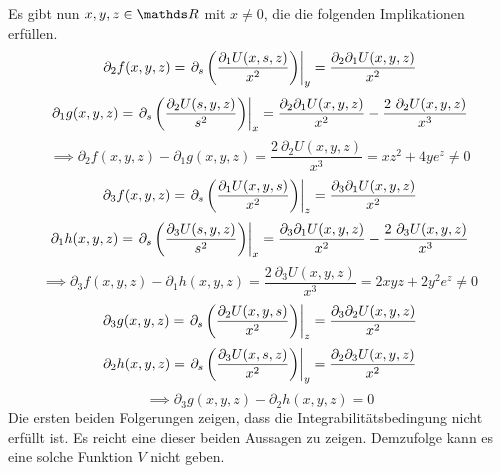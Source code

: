\begin{atiSolution}
\begin{atiSubtaskSolutions}
{      Es gibt nun $x,y,z\in\setR$ mit $x\neq 0$, die die folgenden Implikationen erfüllen.
      \[
        \partial_2f(x,y,z) = \left.\partial_{s} \left( \frac{\partial_1U(x,s,z)}{x^2} \right)\right\vert_{y}^{} = \frac{\partial_2\partial_1U(x,y,z)}{x^2}
      \]
      \[
        \partial_1g(x,y,z) = \pdrvopb{s}{\curvb{\frac{\partial_2U(s,y,z)}{s^2}}}{x} = \frac{\partial_2\partial_1U(x,y,z)}{x^2} - \frac{2\ \partial_2U(x,y,z)}{x^3}
      \]
      \[
        \implies \partial_2f(x,y,z) - \partial_1g(x,y,z) = \frac{2\ \partial_2U(x,y,z)}{x^3} = xz^2 + 4ye^z \neq 0
      \]
      \[
        \partial_3f(x,y,z) = \left.\partial_{s} \left( \frac{\partial_1U(x,y,s)}{x^2} \right)\right\vert_{z}^{} = \frac{\partial_3\partial_1U(x,y,z)}{x^2}
      \]
      \[
        \partial_1h(x,y,z) = \pdrvopb{s}{\curvb{\frac{\partial_3U(s,y,z)}{s^2}}}{x} = \frac{\partial_3\partial_1U(x,y,z)}{x^2} - \frac{2\ \partial_3U(x,y,z)}{x^3}
      \]
      \[
        \implies \partial_3f(x,y,z) - \partial_1h(x,y,z) = \frac{2\ \partial_3U(x,y,z)}{x^3} = 2xyz + 2y^2e^z \neq 0
      \]
      \[
        \partial_3g(x,y,z) = \left.\partial_{s} \left( \frac{\partial_2U(x,y,s)}{x^2} \right)\right\vert_{z}^{} = \frac{\partial_3\partial_2U(x,y,z)}{x^2}
      \]
      \[
        \partial_2h(x,y,z) = \left.\partial_{s} \left( \frac{\partial_3U(x,s,z)}{x^2} \right)\right\vert_{y}^{} = \frac{\partial_2\partial_3U(x,y,z)}{x^2}
      \]
      \[
        \implies \partial_3g(x,y,z) - \partial_2h(x,y,z) = 0
      \]
      \atiPoints[1]Die ersten beiden Folgerungen zeigen, dass die Integrabilitätsbedingung nicht erfüllt ist.
      Es reicht eine dieser beiden Aussagen zu zeigen.
      \atiPoints[1]Demzufolge kann es eine solche Funktion $V$ nicht geben.
    }
  \end{atiSubtaskSolutions}
\end{atiSolution}